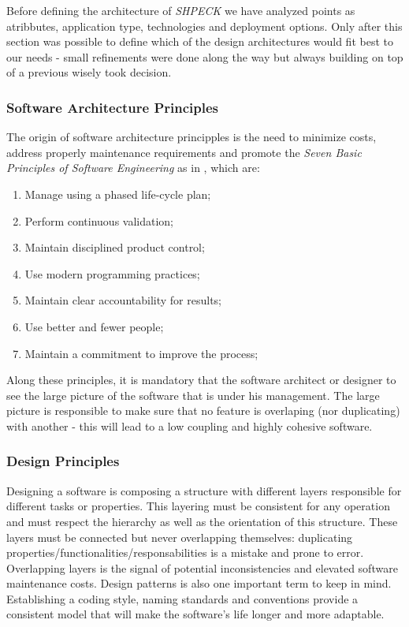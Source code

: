 \documentclass[ppgc,mestrado,english]{iiufrgs}
\begin{document}
Before defining the architecture of \emph{SHPECK} we have analyzed points as atribbutes, application type, technologies and deployment options. Only after this section was possible to define which of the design architectures would fit best to our needs - small refinements were done along the way but always building on top of a previous wisely took decision.

\subsubsection{Software Architecture Principles}
The origin of software architecture principples is the need to minimize costs, address properly maintenance requirements and promote the \emph{Seven Basic Principles of Software Engineering} as in \cite{Boehm:83}, which are:
\begin{enumerate}
\item Manage using a phased life-cycle plan;
\item Perform continuous validation;
\item Maintain disciplined product control;
\item Use modern programming practices;
\item Maintain clear accountability for results;
\item Use better and fewer people;
\item Maintain a commitment to improve the process;
\end{enumerate}
Along these principles, it is mandatory that the software architect or designer to see the large picture of the software that is under his management. The large picture is responsible to make sure that no feature is overlaping (nor duplicating) with another - this will lead to a low coupling and highly cohesive software. 
\subsubsection{Design Principles}
Designing a software is composing a structure with different layers responsible for different tasks or properties. This layering must be consistent for any operation and must respect the hierarchy as well as the orientation of this structure. 
These layers must be connected but never overlapping themselves: duplicating properties/functionalities/responsabilities is a mistake and prone to error. Overlapping layers is the signal of potential inconsistencies and elevated software maintenance costs. Design patterns is also one important term to keep in mind. Establishing a coding style, naming standards and conventions provide a consistent model that will make the software's life longer and more adaptable.
\end{document}
